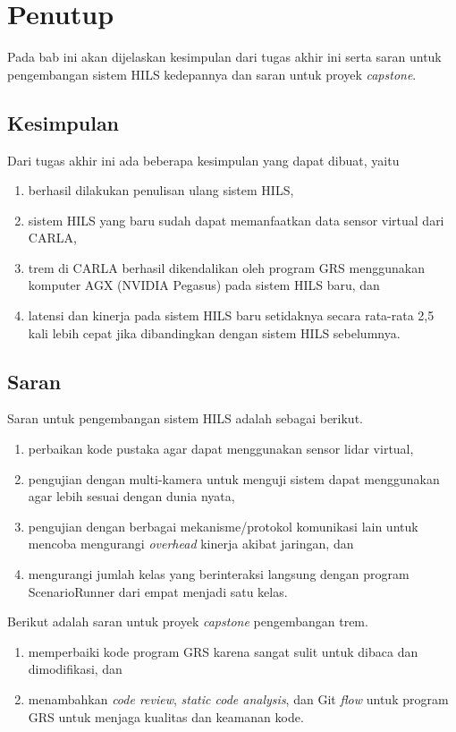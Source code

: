 \chapter{Penutup}\label{chapter-5}

Pada bab ini akan dijelaskan kesimpulan dari tugas akhir ini serta saran untuk
pengembangan sistem HILS kedepannya dan saran untuk proyek \textit{capstone}.

\section{Kesimpulan}

Dari tugas akhir ini ada beberapa kesimpulan yang dapat dibuat, yaitu
\begin{enumerate}
	\item berhasil dilakukan penulisan ulang sistem HILS,
	\item sistem HILS yang baru sudah dapat memanfaatkan data sensor virtual
	      dari CARLA,
	\item trem di CARLA berhasil dikendalikan oleh program GRS menggunakan
	      komputer AGX (NVIDIA Pegasus) pada sistem HILS baru, dan
	\item latensi dan kinerja pada sistem HILS baru setidaknya secara rata-rata
	      2,5 kali lebih cepat jika dibandingkan dengan sistem HILS sebelumnya.
\end{enumerate}

\section{Saran}

Saran untuk pengembangan sistem HILS adalah sebagai berikut.
\begin{enumerate}
	\item perbaikan kode pustaka agar dapat menggunakan sensor lidar virtual,
	\item pengujian dengan multi-kamera untuk menguji sistem dapat menggunakan
	      agar lebih sesuai dengan dunia nyata,
	\item pengujian dengan berbagai mekanisme/protokol komunikasi lain untuk
	      mencoba mengurangi \textit{overhead} kinerja akibat jaringan, dan
	\item mengurangi jumlah kelas yang berinteraksi langsung dengan program
	      ScenarioRunner dari empat menjadi satu kelas.
\end{enumerate}

Berikut adalah saran untuk proyek \textit{capstone} pengembangan trem.
\begin{enumerate}
	\item memperbaiki kode program GRS karena sangat sulit untuk dibaca dan
	      dimodifikasi, dan
	\item menambahkan \textit{code review}, \textit{static code analysis}, dan
	      Git \textit{flow} untuk program GRS untuk menjaga kualitas dan keamanan
	      kode.
\end{enumerate}
